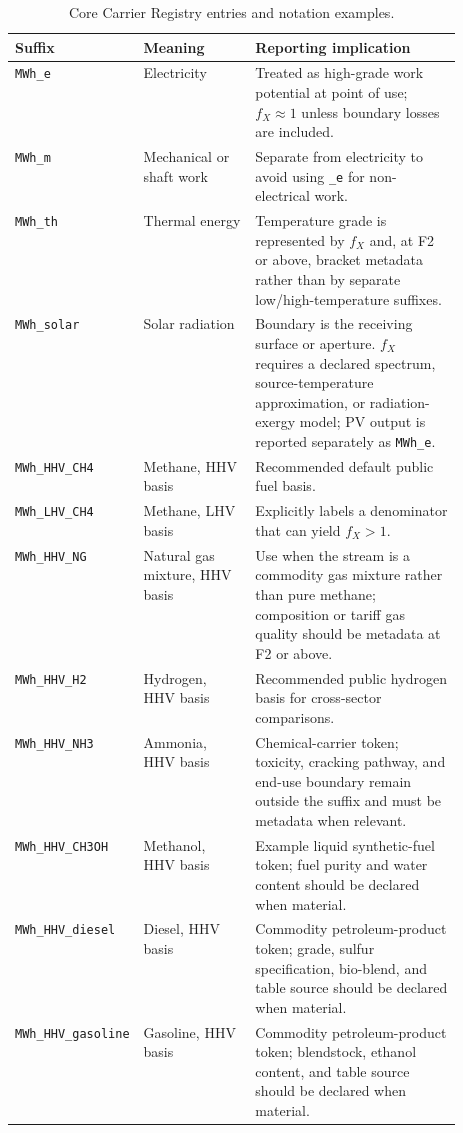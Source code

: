 \documentclass[11pt]{article}
\newcommand{\fx}{f_X}
\begin{document}
\begin{table}[H]
\centering
\small
\caption{Core Carrier Registry entries and notation examples.}
\label{tab:carrier_registry}
\begin{tabularx}{\linewidth}{@{}p{0.27\linewidth}p{0.25\linewidth}X@{}}
\toprule
Suffix & Meaning & Reporting implication \\
\midrule
\texttt{MWh\_e} & Electricity & Treated as high-grade work potential at point of use; $\fx\approx 1$ unless boundary losses are included. \\
\texttt{MWh\_m} & Mechanical or shaft work & Separate from electricity to avoid using \texttt{\_e} for non-electrical work. \\
\texttt{MWh\_th} & Thermal energy & Temperature grade is represented by $\fx$ and, at F2 or above, bracket metadata rather than by separate low/high-temperature suffixes. \\
\texttt{MWh\_solar} & Solar radiation & Boundary is the receiving surface or aperture. $\fx$ requires a declared spectrum, source-temperature approximation, or radiation-exergy model; PV output is reported separately as \texttt{MWh\_e}. \\
\texttt{MWh\_HHV\_CH4} & Methane, HHV basis & Recommended default public fuel basis. \\
\texttt{MWh\_LHV\_CH4} & Methane, LHV basis & Explicitly labels a denominator that can yield $\fx>1$. \\
\texttt{MWh\_HHV\_NG} & Natural gas mixture, HHV basis & Use when the stream is a commodity gas mixture rather than pure methane; composition or tariff gas quality should be metadata at F2 or above. \\
\texttt{MWh\_HHV\_H2} & Hydrogen, HHV basis & Recommended public hydrogen basis for cross-sector comparisons. \\
\texttt{MWh\_HHV\_NH3} & Ammonia, HHV basis & Chemical-carrier token; toxicity, cracking pathway, and end-use boundary remain outside the suffix and must be metadata when relevant. \\
\texttt{MWh\_HHV\_CH3OH} & Methanol, HHV basis & Example liquid synthetic-fuel token; fuel purity and water content should be declared when material. \\
\texttt{MWh\_HHV\_diesel} & Diesel, HHV basis & Commodity petroleum-product token; grade, sulfur specification, bio-blend, and table source should be declared when material. \\
\texttt{MWh\_HHV\_gasoline} & Gasoline, HHV basis & Commodity petroleum-product token; blendstock, ethanol content, and table source should be declared when material. \\

\end{tabularx}
\end{table}
\end{document}
